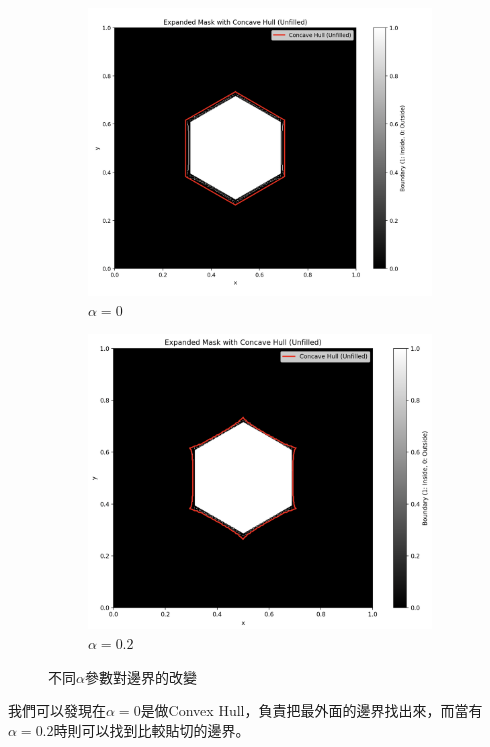 \documentclass[12pt, a4paper]{article}
\theoremstyle{mystyle}	%
\begin{document}
\begin{figure}[H]
\centering
\begin{subfigure}{.5\textwidth}
    \centering
    \includegraphics[height=.8\linewidth]{alpha_0.png}
    \caption{\(\alpha = 0\)}
    \label{pot}
\end{subfigure}%
\begin{subfigure}{.5\textwidth}
    \centering
    \includegraphics[height=.8\linewidth]{alpha_2.png}
    \caption{\(\alpha = 0.2\)}
    \label{grad}
    \end{subfigure}
    \caption{不同\(\alpha\)參數對邊界的改變}
    \label{pog}
\end{figure}
我們可以發現在\(\alpha = 0\)是做Convex Hull，負責把最外面的邊界找出來，而當有\(\alpha = 0.2\)時則可以找到比較貼切的邊界。
\end{document}
